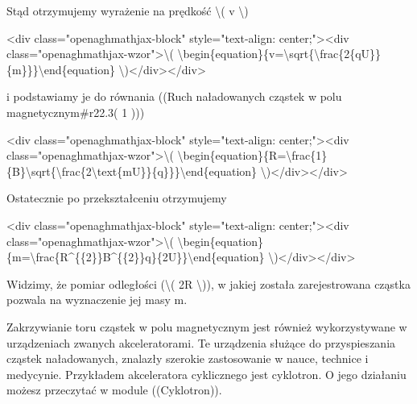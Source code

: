 Stąd otrzymujemy wyrażenie na prędkość \textbackslash{}( v
\textbackslash{})

\textless{}div class="openaghmathjax-block" style="text-align:
center;"\textgreater{}\textless{}div
class="openaghmathjax-wzor"\textgreater{}\textbackslash{}(
\textbackslash{}begin\{equation\}\{v=\textbackslash{}sqrt\{\textbackslash{}frac\{2\{qU\}\}\{m\}\}\}\textbackslash{}end\{equation\}
\textbackslash{})\textless{}/div\textgreater{}\textless{}/div\textgreater{}

i podstawiamy je do równania ((Ruch naładowanych cząstek w polu
magnetycznym\textbar{}\#r22.3\textbar{}( 1 )))

\textless{}div class="openaghmathjax-block" style="text-align:
center;"\textgreater{}\textless{}div
class="openaghmathjax-wzor"\textgreater{}\textbackslash{}(
\textbackslash{}begin\{equation\}\{R=\textbackslash{}frac\{1\}\{B\}\textbackslash{}sqrt\{\textbackslash{}frac\{2\textbackslash{}text\{mU\}\}\{q\}\}\}\textbackslash{}end\{equation\}
\textbackslash{})\textless{}/div\textgreater{}\textless{}/div\textgreater{}

Ostatecznie po przekształceniu otrzymujemy

\textless{}div class="openaghmathjax-block" style="text-align:
center;"\textgreater{}\textless{}div
class="openaghmathjax-wzor"\textgreater{}\textbackslash{}(
\textbackslash{}begin\{equation\}\{m=\textbackslash{}frac\{R\^{}\{\{2\}\}B\^{}\{\{2\}\}q\}\{2U\}\}\textbackslash{}end\{equation\}
\textbackslash{})\textless{}/div\textgreater{}\textless{}/div\textgreater{}

Widzimy, że pomiar odległości (\textbackslash{}( 2R \textbackslash{})),
w jakiej została zarejestrowana cząstka pozwala na wyznaczenie jej masy
m.

Zakrzywianie toru cząstek w polu magnetycznym jest również
wykorzystywane w urządzeniach zwanych akceleratorami. Te urządzenia
służące do przyspieszania cząstek naładowanych, znalazły szerokie
zastosowanie w nauce, technice i medycynie. Przykładem akceleratora
cyklicznego jest cyklotron. O jego działaniu możesz przeczytać w module
((Cyklotron)).
